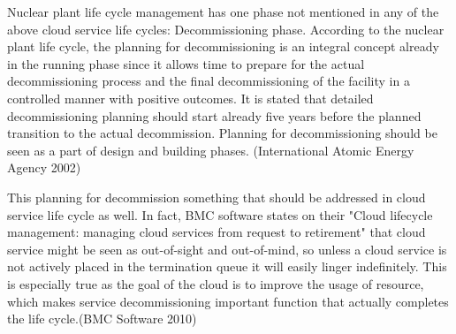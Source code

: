 \documentclass{article}
\begin{document}
\par
Nuclear plant life cycle management has one phase not mentioned in any of the above cloud service life cycles: Decommissioning phase. According to the nuclear plant life cycle, the planning for decommissioning is an integral concept already in the running phase since it allows time to prepare for the actual decommissioning process and the final decommissioning of the facility in a controlled manner with positive outcomes. It is stated that detailed decommissioning planning should start already five years before the planned transition to the actual decommission. Planning for decommissioning should be seen as a part of design and building phases. (International Atomic Energy Agency 2002)
\par
This planning for decommission something that should be addressed in cloud service life cycle as well. In fact, BMC software states on their "Cloud lifecycle management: managing cloud services from request to retirement" that cloud service might be seen as out-of-sight and out-of-mind, so unless a cloud service is not actively placed in the termination queue it will easily linger indefinitely. This is especially true as the goal of the cloud is to improve the usage of resource, which makes service decommissioning important function that actually completes the life cycle.(BMC Software 2010)
\end{document}
